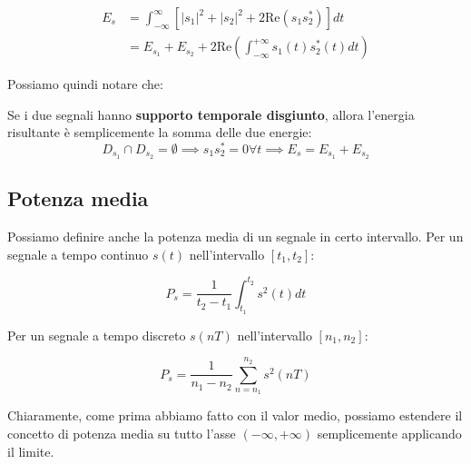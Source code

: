 \begin{warning}
    \[
    \begin{aligned}
        E_s &= \int_{-\infty}^{\infty} \left[ |s_{1}|^2 + |s_{2}|^2 + 2 \text{Re}(s_{1}s_{2}^*) \right] dt \\ 
            &= E_{s_{1}} + E_{s_{2}} + 2 \text{Re} 
            \left( \int_{-\infty}^{+\infty} s_{1}(t)s_{2}^*(t) dt\right)
    \end{aligned}
    \] 
\end{warning}

Possiamo quindi notare che:

\begin{remark}
    Se i due segnali hanno \textbf{supporto temporale disgiunto}, allora l'energia
    risultante è semplicemente la somma delle due energie:
    \[
        D_{s_{1}} \cap D_{s_{2}} = \emptyset \implies s_{1}s_{2}^* = 0 \forall t 
        \implies E_s = E_{s_{1}} + E_{s_{2}}
    \] 
\end{remark}

\subsection{Potenza media}

Possiamo definire anche la potenza media di un segnale in certo intervallo.
Per un segnale a tempo continuo $s(t)$ nell'intervallo $[t_{1},t_{2}]$:

\begin{definition}
    \[
        P_s = \frac{1}{t_{2}-t_{1}} \int_{t_{1}}^{t_{2}} s^2(t)dt
    \] 
\end{definition}

Per un segnale a tempo discreto $s(nT)$ nell'intervallo $[n_{1},n_{2}]$:

\begin{definition}
    \[
        P_s = \frac{1}{n_{1}-n_{2}} \sum_{n=n_{1}}^{n_{2}} s^2(nT)
    \] 
\end{definition}

Chiaramente, come prima abbiamo fatto con il valor medio, possiamo estendere il concetto
di potenza media su tutto l'asse $(-\infty,+\infty)$ semplicemente applicando il limite.

